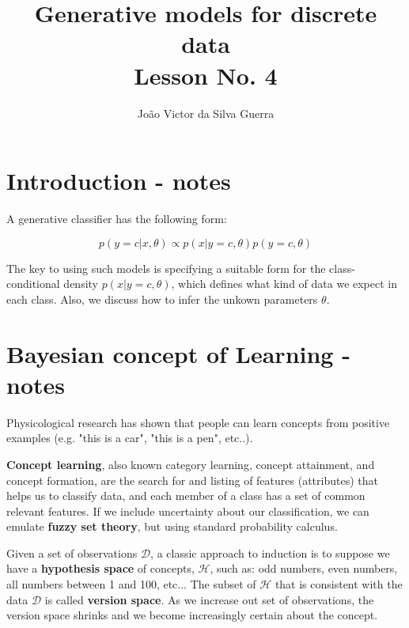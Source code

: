 \documentclass{article}
\makeatletter
\DeclareRobustCommand\onedot{\futurelet\@let@token\@onedot}
\def\@onedot{\ifx\@let@token.\else.\null\fi\xspace}
\def\etc{etc\onedot} \def\vs{vs\onedot}
\makeatother
\begin{document}
\title{Generative models for discrete data\\\normalsize Lesson No. 4}
\author{Jo\~ao Victor da Silva Guerra}

\maketitle

\section{Introduction - notes}

A generative classifier has the following form:

\begin{equation}
  p(y=c|x,\theta) \propto p(x|y=c,\theta)p(y=c,\theta)
\end{equation}

The key to using such models is specifying a suitable form for the class-conditional density $p(x|y=c,\theta)$, which defines what kind of data we expect in each class. Also, we discuss how to infer the unkown parameters $\theta$.

\section{Bayesian concept of Learning - notes}

Physicological research has shown that people can learn concepts from positive examples (e.g. "this is a car", "this is a pen", \etc).

\textbf{Concept learning}, also known category learning, concept attainment, and concept formation, are the search for and listing of features (attributes) that helps us to classify data, and each member of a class has a set of common relevant features. If we include uncertainty about our classification, we can emulate \textbf{fuzzy set theory}, but using standard probability calculus.

Given a set of observations $\mathcal{D}$, a classic approach to induction is to suppose we have a \textbf{hypothesis space} of concepts, $\mathcal{H}$, such as: odd numbers, even numbers, all numbers between 1 and 100, \etc. The subset of $\mathcal{H}$ that is consistent with the data $\mathcal{D}$ is called \textbf{version space}. As we increase out set of observations, the version space shrinks and we become increasingly certain about the concept.
\end{document}
